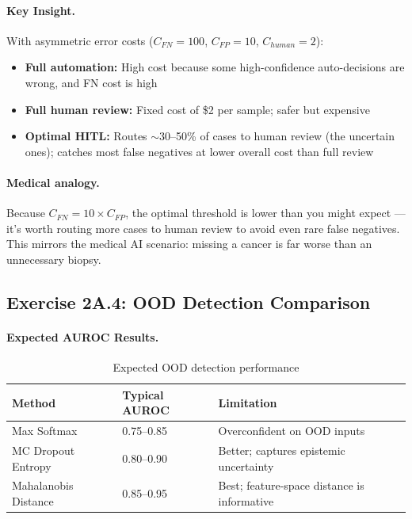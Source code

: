 \paragraph{Key Insight.}

With asymmetric error costs ($C_{FN} = 100$, $C_{FP} = 10$, $C_{human} = 2$):

\begin{itemize}
    \item \textbf{Full automation:} High cost because some high-confidence auto-decisions are wrong, and FN cost is high
    \item \textbf{Full human review:} Fixed cost of \$2 per sample; safer but expensive
    \item \textbf{Optimal HITL:} Routes $\sim$30--50\% of cases to human review (the uncertain ones); catches most false negatives at lower overall cost than full review
\end{itemize}

\paragraph{Medical analogy.} Because $C_{FN} = 10 \times C_{FP}$, the optimal threshold is lower than you might expect --- it's worth routing more cases to human review to avoid even rare false negatives. This mirrors the medical AI scenario: missing a cancer is far worse than an unnecessary biopsy.

\subsection{Exercise 2A.4: OOD Detection Comparison}

\paragraph{Expected AUROC Results.}

\begin{table}[htbp]
\caption{Expected OOD detection performance}
\label{tab:ood-detection}
\centering
\begin{tabular}{@{}lll@{}}
\toprule
\textbf{Method} & \textbf{Typical AUROC} & \textbf{Limitation} \\
\midrule
Max Softmax & 0.75--0.85 & Overconfident on OOD inputs \\
MC Dropout Entropy & 0.80--0.90 & Better; captures epistemic uncertainty \\
Mahalanobis Distance & 0.85--0.95 & Best; feature-space distance is informative \\
\bottomrule
\end{tabular}
\end{table}

